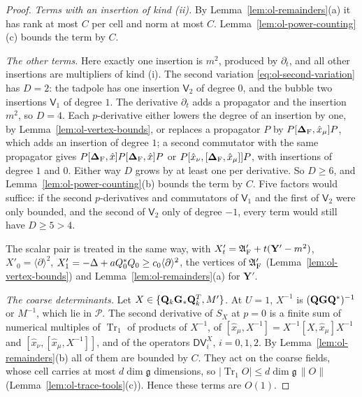 \begin{proof}
\emph{Terms with an insertion of kind (ii).} By Lemma~\ref{lem:ol-remainders}(a) it has rank at most $C$ per cell and norm at most $C$. Lemma~\ref{lem:ol-power-counting}(c) bounds the term by $C$.

\emph{The other terms.} Here exactly one insertion is $m^2$, produced by $\partial_t$, and all other insertions are multipliers of kind (i). The second variation \eqref{eq:ol-second-variation} has $D=2$: the tadpole has one insertion $\mathsf V_2$ of degree $0$, and the bubble two insertions $\mathsf V_1$ of degree $1$. The derivative $\partial_t$ adds a propagator and the insertion $m^2$, so $D=4$. Each $p$-derivative either lowers the degree of an insertion by one, by Lemma~\ref{lem:ol-vertex-bounds}, or replaces a propagator $P$ by $P[\boldsymbol{\Delta}_{\rm F},\hat x_\mu]P$, which adds an insertion of degree $1$; a second commutator with the same propagator gives $P[\boldsymbol{\Delta}_{\rm F},\hat x]P[\boldsymbol{\Delta}_{\rm F},\hat x]P$ or $P[\hat x_\nu,[\boldsymbol{\Delta}_{\rm F},\hat x_\mu]]P$, with insertions of degree $1$ and $0$. Either way $D$ grows by at least one per derivative. So $D\ge6$, and Lemma~\ref{lem:ol-power-counting}(b) bounds the term by $C$. Five factors would suffice: if the second $p$-derivatives and commutators of $\mathsf V_1$ and the first of $\mathsf V_2$ were only bounded, and the second of $\mathsf V_2$ only of degree $-1$, every term would still have $D\ge5>4$.

The scalar pair is treated in the same way, with $X'_t=\mathfrak A'_{\rm F}+t(\mathbf Y'-m^2)$, $X'_0=\langle\partial\rangle^2$, $X'_1=-\Delta+aQ_0^*Q_0\ge c_0\langle\partial\rangle^2$, the vertices of $\mathfrak A'_{\rm F}$ (Lemma~\ref{lem:ol-vertex-bounds}) and Lemma~\ref{lem:ol-remainders}(a) for $\mathbf Y'$.

\emph{The coarse determinants.} Let $X\in\{\mathbf Q_k\mathbf G_*\mathbf Q_k^T,M'\}$. At $U=1$, $X^{-1}$ is $(\mathbf Q\mathbf G\mathbf Q^*)^{-1}$ or $M^{-1}$, which lie in $\mathscr P$. The second derivative of $S_X$ at $p=0$ is a finite sum of numerical multiples of $\operatorname{Tr}_1$ of products of $X^{-1}$, of $[\hat x_\mu,X^{-1}]=X^{-1}[X,\hat x_\mu]X^{-1}$ and $[\hat x_\nu,[\hat x_\mu,X^{-1}]]$, and of the operators $\mathsf D\mathsf V_i^X$, $i=0,1,2$. By Lemma~\ref{lem:ol-remainders}(b) all of them are bounded by $C$. They act on the coarse fields, whose cell carries at most $d\dim\mathfrak g$ dimensions, so $|\operatorname{Tr}_1O|\le d\dim\mathfrak g\,\|O\|$ (Lemma~\ref{lem:ol-trace-tools}(c)). Hence these terms are $O(1)$.
\end{proof}

